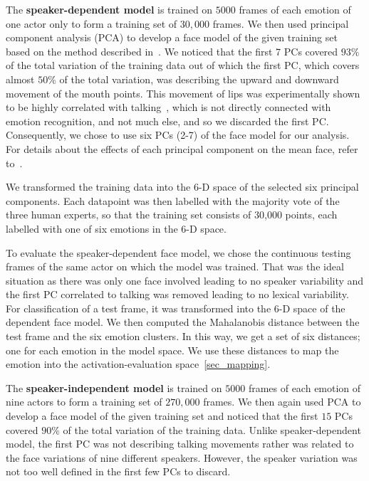 \documentclass[10pt,journal,cspaper,compsoc]{IEEEtran}
\begin{document}
The \textbf{speaker-dependent model} is trained on $5000$ frames of each emotion of one actor only to form a training set of $30,000$ frames. We then used principal component analysis (PCA) to develop a face model of the given training set based on the method described in~\cite{ayesha hakim shape model paper}. We noticed that the first 7 PCs covered $93\%$ of the total variation of the training data out of which the first PC, which covers almost $50\%$ of the total variation, was describing the upward and downward movement of the mouth points. This movement of lips was experimentally shown to be highly correlated with talking~\cite{ayesha hakim shape models}, which is not directly connected with emotion recognition, and not much else, and so we discarded the first PC. Consequently, we chose to use six PCs (2-7) of the face model for our analysis. For details about the effects of each principal component on the mean face, refer to~\cite{ayesha hakim shape models}.

We transformed the training data into the 6-D space of the selected six principal components. Each datapoint was then labelled with the majority vote of the three human experts, so that the training set consists of 30,000 points, each labelled with one of six emotions in the 6-D space. 

To evaluate the speaker-dependent face model, we chose the continuous testing frames of the same actor on which the model was trained. That was the ideal situation as there was only one face involved leading to no speaker variability and the first PC correlated to talking was removed leading to no lexical variability. For classification of a test frame, it was transformed into the 6-D space of the dependent face model. We then computed the Mahalanobis distance between the test frame and the six emotion clusters. In this way, we get a set of six distances; one for each emotion in the model space. We use these distances to map the emotion into the activation-evaluation space~\ref{sec_mapping}.

The \textbf{speaker-independent model}  is trained on $5000$ frames of each emotion of nine actors to form a training set of $270,000$ frames. We then again used PCA to develop a face model of the given training set and noticed that the first $15$ PCs covered $90\%$ of the total variation of the training data. Unlike speaker-dependent model, the first PC was not describing talking movements rather was related to the face variations of nine different speakers. However, the speaker variation was not too well defined in the first few PCs to discard. 
\end{document}
